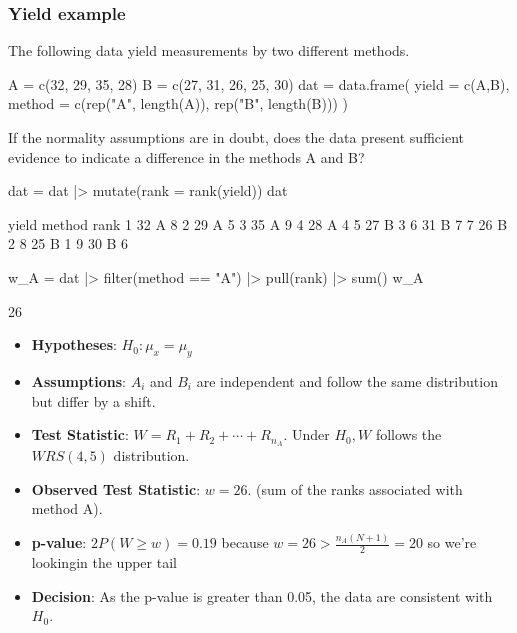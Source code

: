 \documentclass[a4paper]{article}\usepackage[]{graphicx}\usepackage[]{xcolor}
\begin{document}
\subsubsection{Yield example}
The following data yield measurements by two different methods.
\begin{Schunk}
\begin{Sinput}
A = c(32, 29, 35, 28)
B = c(27, 31, 26, 25, 30)
dat = data.frame(
  yield = c(A,B),
  method = c(rep("A", length(A)),
		   	 rep("B", length(B)))
)
\end{Sinput}
\end{Schunk}
If the normality assumptions are in doubt, does the data present sufficient evidence to indicate a difference in the methods A and B?
\begin{Schunk}
\begin{Sinput}
dat = dat |> mutate(rank = rank(yield))
dat
\end{Sinput}
\begin{Soutput}
  yield method rank
1    32      A    8
2    29      A    5
3    35      A    9
4    28      A    4
5    27      B    3
6    31      B    7
7    26      B    2
8    25      B    1
9    30      B    6
\end{Soutput}
\begin{Sinput}
w_A = dat |> 
filter(method == "A") |> 
pull(rank) |> 
sum()
w_A
\end{Sinput}
\begin{Soutput}
[1] 26
\end{Soutput}
\end{Schunk}
\begin{itemize}
	\item \textbf{Hypotheses}: \( H_0: \mu_x = \mu_y \)
	\item \textbf{Assumptions}: \( A_i \) and \( B_i \) are independent and follow the same distribution but differ by a shift.
	\item \textbf{Test Statistic}: \( W = R_1 + R_2 + \dotsb + R_{n_A} \). Under \( H_0, W \) follows the \( WRS (4,5) \) distribution.
	\item \textbf{Observed Test Statistic}: \( w =26 \). (sum of the ranks associated with method A).
	\item \textbf{p-value}: \( 2P(W \geq w) = 0.19 \) because \( w = 26 > \frac{n_A (N+1)}{2} = 20 \) so we're lookingin the upper tail
	\item \textbf{Decision}: As the p-value is greater than 0.05, the data are consistent with \( H_0 \).
\end{itemize}
\end{document}
